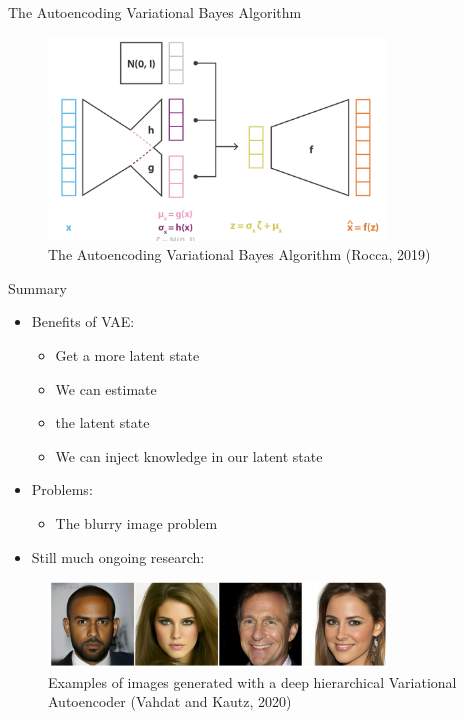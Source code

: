 \documentclass[10pt]{beamer}
\begin{document}
\begin{frame}{The Autoencoding Variational Bayes Algorithm}

\begin{figure}[h]
\centering
\includegraphics[width=0.8\textwidth]{fig/Rocca_VAE_full_reparmetr.png}
\caption{The Autoencoding Variational Bayes Algorithm (Rocca, 2019)}
\end{figure}

\end{frame}

\begin{frame}{Summary}

\begin{itemize}
\item Benefits of VAE:
\begin{itemize}
\item Get a more  latent state
\item We can estimate 
\item {} the latent state
\item We can inject knowledge in our latent state
\end{itemize}
\pause
\item Problems:
\begin{itemize}
\item The blurry image problem %
\end{itemize}
\pause
\item Still much ongoing research:
\end{itemize}

\begin{figure}[h]
\centering
\includegraphics[width=0.8\textwidth]{fig/Vahdat_Kautz_NVEA_2020.png}
\caption{Examples of images generated with a deep hierarchical Variational Autoencoder (Vahdat and Kautz, 2020)}
\end{figure}

\end{frame}
\end{document}
